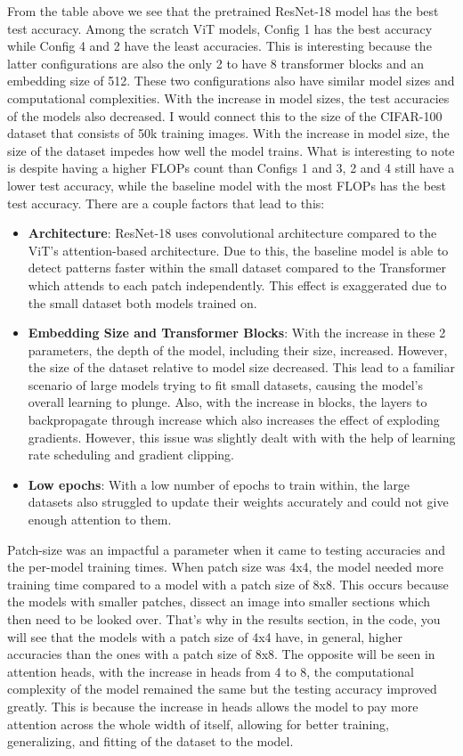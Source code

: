 \documentclass[a4paper]{article}
\begin{document}
From the table above we see that the pretrained ResNet-18 model has the best test accuracy. Among the scratch ViT models, Config 1 has the best accuracy while Config 4 and 2 have the least accuracies. This is interesting because the latter configurations are also the only 2 to have 8 transformer blocks and an embedding size of 512. These two configurations also have similar model sizes and computational complexities. With the increase in model sizes, the test accuracies of the models also decreased. I would connect this to the size of the CIFAR-100 dataset that consists of 50k training images. With the increase in model size, the size of the dataset impedes how well the model trains. What is interesting to note is despite having a higher FLOPs count than Configs 1 and 3, 2 and 4 still have a lower test accuracy, while the baseline model with the most FLOPs has the best test accuracy. There are a couple factors that lead to this:
\begin{itemize}
    \item \textbf{Architecture}: ResNet-18 uses convolutional architecture compared to the ViT's attention-based architecture. Due to this, the baseline model is able to detect patterns faster within the small dataset compared to the Transformer which attends to each patch independently. This effect is exaggerated due to the small dataset both models trained on.
    \item \textbf{Embedding Size and Transformer Blocks}: With the increase in these 2 parameters, the depth of the model, including their size, increased. However, the size of the dataset relative to model size decreased. This lead to a familiar scenario of large models trying to fit small datasets, causing the model's overall learning to plunge. Also, with the increase in blocks, the layers to backpropagate through increase which also increases the effect of exploding gradients. However, this issue was slightly dealt with with the help of learning rate scheduling and gradient clipping.
    \item \textbf{Low epochs}: With a low number of epochs to train within, the large datasets also struggled to update their weights accurately and could not give enough attention to them.
\end{itemize}

Patch-size was an impactful a parameter when it came to testing accuracies and the per-model training times. When patch size was 4x4, the model needed more training time compared to a model with a patch size of 8x8. This occurs because the models with smaller patches, dissect an image into smaller sections which then need to be looked over. That's why in the results section, in the code, you will see that the models with a patch size of 4x4 have, in general, higher accuracies than the ones with a patch size of 8x8. The opposite will be seen in attention heads, with the increase in heads from 4 to 8, the computational complexity of the model remained the same but the testing accuracy improved greatly. This is because the increase in heads allows the model to pay more attention across the whole width of itself, allowing for better training, generalizing, and fitting of the dataset to the model.
\end{document}
